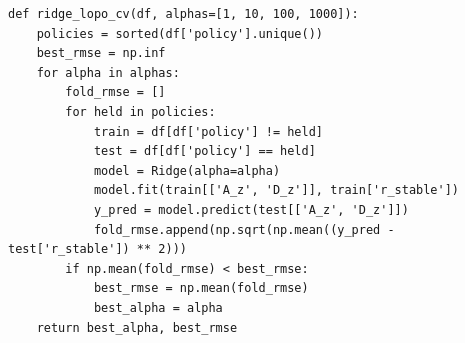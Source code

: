 \documentclass[12pt,a4paper]{article}
\begin{document}
\begin{appendices}
\begin{lstlisting}[caption={问题二：Kruskal-Wallis 检验与 A/D 重参数化},label={lst:q2}]
def ridge_lopo_cv(df, alphas=[1, 10, 100, 1000]):
    policies = sorted(df['policy'].unique())
    best_rmse = np.inf
    for alpha in alphas:
        fold_rmse = []
        for held in policies:
            train = df[df['policy'] != held]
            test = df[df['policy'] == held]
            model = Ridge(alpha=alpha)
            model.fit(train[['A_z', 'D_z']], train['r_stable'])
            y_pred = model.predict(test[['A_z', 'D_z']])
            fold_rmse.append(np.sqrt(np.mean((y_pred - test['r_stable']) ** 2)))
        if np.mean(fold_rmse) < best_rmse:
            best_rmse = np.mean(fold_rmse)
            best_alpha = alpha
    return best_alpha, best_rmse
\end{lstlisting}

\end{appendices}
\label{appendix:end}
\end{document}
